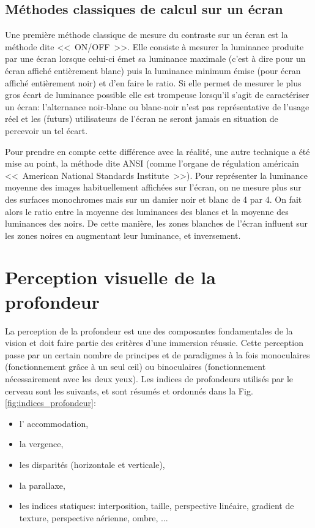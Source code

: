 	\section{Méthodes classiques de calcul sur un écran}
	\par Une première méthode classique de mesure du contraste sur un écran est la méthode dite <<~ON/OFF~>>. Elle consiste à mesurer la luminance produite par une écran lorsque celui-ci émet sa luminance maximale (c'est à dire pour un écran affiché entièrement blanc) puis la luminance minimum émise (pour écran affiché entièrement noir) et d'en faire le ratio. Si elle permet de mesurer le plus gros écart de luminance possible elle est trompeuse lorsqu'il s'agit de caractériser un écran: l'alternance noir-blanc ou blanc-noir n'est pas représentative de l'usage réel et les (futurs) utilisateurs de l'écran ne seront jamais en situation de percevoir un tel écart.
	
	\par Pour prendre en compte cette différence avec la réalité, une autre technique a été mise au point, la méthode dite ANSI (comme l'organe de régulation américain <<~American National Standards Institute~>>). Pour représenter la luminance moyenne des images habituellement affichées sur l'écran, on ne mesure plus sur des surfaces monochromes mais sur un damier noir et blanc de 4 par 4. On fait alors le ratio entre la moyenne des luminances des blancs et la moyenne des luminances des noirs. De cette manière, les zones blanches de l'écran influent sur les zones noires en augmentant leur luminance, et inversement.
	
\chapter{Perception visuelle de la profondeur}
	\par La perception de la profondeur est une des composantes fondamentales de la vision et doit faire partie des critères d'une immersion réussie. Cette perception passe par un certain nombre de principes et de paradigmes à la fois monoculaires (fonctionnement grâce à un seul œil) ou binoculaires (fonctionnement nécessairement avec les deux yeux). Les indices de profondeurs utilisés par le cerveau sont les suivants, et sont résumés et ordonnés dans la Fig. \ref{fig:indices_profondeur}:
	\begin{itemize}
	\item l' accommodation,
	\item la vergence,
	\item les disparités (horizontale et verticale),
	\item la parallaxe,
	\item les indices statiques: interposition, taille, perspective linéaire, gradient de texture, perspective aérienne, ombre, ...
	\end{itemize}
	
